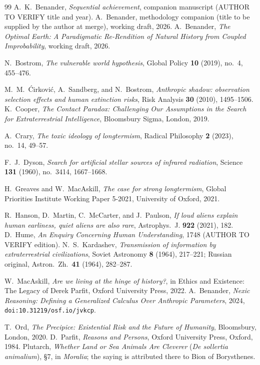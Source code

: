 \documentclass[11pt]{article}
\theoremstyle{plain}
\theoremstyle{definition}
\theoremstyle{remark}
\begin{document}
\begin{thebibliography}{99}\small
{} A.~K.~Benander, \emph{Sequential achievement},
companion manuscript (AUTHOR TO VERIFY title and year).
 A.~Benander, methodology companion (title to be
supplied by the author at merge), working draft, 2026.
 A.~Benander, \emph{The Optimal Earth: A
Paradigmatic Re-Rendition of Natural History from Coupled
Improbability}, working draft, 2026.

 N.~Bostrom, \emph{The vulnerable world
hypothesis}, Global Policy \textbf{10} (2019), no.~4, 455--476.

 M.~M.~{\'C}irkovi{\'c}, A.~Sandberg, and N.~Bostrom,
\emph{Anthropic shadow: observation selection effects and human
extinction risks}, Risk Analysis \textbf{30} (2010), 1495--1506.
 K.~Cooper, \emph{The Contact Paradox:
Challenging Our Assumptions in the Search for Extraterrestrial
Intelligence}, Bloomsbury Sigma, London, 2019.

 A.~Crary, \emph{The toxic ideology of
longtermism}, Radical Philosophy \textbf{2} (2023), no.~14, 49--57.

 F.~J.~Dyson, \emph{Search for artificial stellar
sources of infrared radiation}, Science \textbf{131} (1960), no.~3414,
1667--1668.

 H.~Greaves and W.~MacAskill, \emph{The case for
strong longtermism}, Global Priorities Institute Working Paper 5-2021,
University of Oxford, 2021.

 R.~Hanson, D.~Martin, C.~McCarter, and J.~Paulson,
\emph{If loud aliens explain human earliness, quiet aliens are also
rare}, Astrophys.\ J. \textbf{922} (2021), 182.
 D.~Hume, \emph{An Enquiry Concerning Human
Understanding}, 1748 (AUTHOR TO VERIFY edition).
 N.~S.~Kardashev, \emph{Transmission of
information by extraterrestrial civilizations}, Soviet Astronomy
\textbf{8} (1964), 217--221; Russian original, Astron.\ Zh.\
\textbf{41} (1964), 282--287.

 W.~MacAskill, \emph{Are we living at the hinge of
history?}, in Ethics and Existence: The Legacy of Derek Parfit, Oxford
University Press, 2022.
 A.~Benander, \emph{Nexic Reasoning: Defining
a Generalized Calculus Over Anthropic Parameters}, 2024,
\texttt{doi:10.31219/osf.io/jvkcp}.

 T.~Ord, \emph{The Precipice: Existential Risk and the
Future of Humanity}, Bloomsbury, London, 2020.
 D.~Parfit, \emph{Reasons and Persons}, Oxford
University Press, Oxford, 1984.
 Plutarch, \emph{Whether Land or Sea Animals Are
Cleverer} (\emph{De sollertia animalium}), \S7, in \emph{Moralia};
the saying is attributed there to Bion of Borysthenes.


\end{thebibliography}
\end{document}
